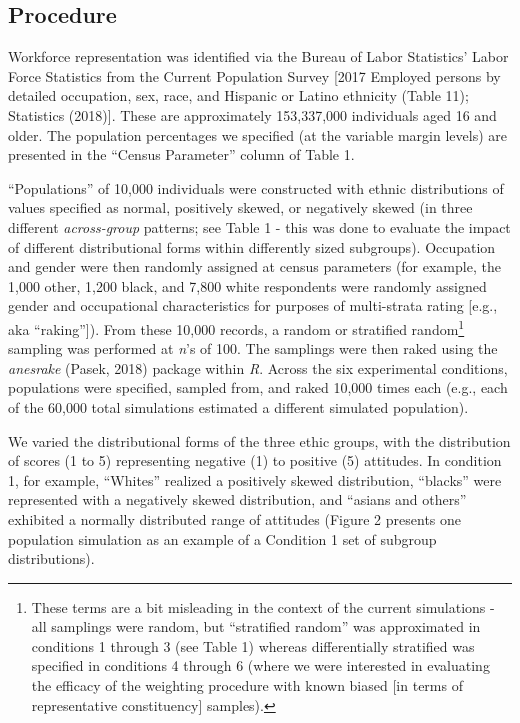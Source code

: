 \documentclass[
  ,man]{apa6}
\begin{document}
\hypertarget{procedure}{%
\subsection{Procedure}\label{procedure}}

Workforce representation was identified via the Bureau of Labor Statistics' Labor Force Statistics from the Current Population Survey {[}2017 Employed persons by detailed occupation, sex, race, and Hispanic or Latino ethnicity (Table 11); Statistics (2018){]}. These are approximately 153,337,000 individuals aged 16 and older. The population percentages we specified (at the variable margin levels) are presented in the ``Census Parameter'' column of Table 1.

``Populations'' of 10,000 individuals were constructed with ethnic distributions of values specified as normal, positively skewed, or negatively skewed (in three different \emph{across-group} patterns; see Table 1 - this was done to evaluate the impact of different distributional forms within differently sized subgroups). Occupation and gender were then randomly assigned at census parameters (for example, the 1,000 other, 1,200 black, and 7,800 white respondents were randomly assigned gender and occupational characteristics for purposes of multi-strata rating {[}e.g., aka ``raking''{]}). From these 10,000 records, a random or stratified random\footnote{These terms are a bit misleading in the context of the current simulations - all samplings were random, but ``stratified random'' was approximated in conditions 1 through 3 (see Table 1) whereas differentially stratified was specified in conditions 4 through 6 (where we were interested in evaluating the efficacy of the weighting procedure with known biased {[}in terms of representative constituency{]} samples).} sampling was performed at \emph{n}'s of 100. The samplings were then raked using the \emph{anesrake} (Pasek, 2018) package within \emph{R}. Across the six experimental conditions, populations were specified, sampled from, and raked 10,000 times each (e.g., each of the 60,000 total simulations estimated a different simulated population).

We varied the distributional forms of the three ethic groups, with the distribution of scores (1 to 5) representing negative (1) to positive (5) attitudes. In condition 1, for example, ``Whites'' realized a positively skewed distribution, ``blacks'' were represented with a negatively skewed distribution, and ``asians and others'' exhibited a normally distributed range of attitudes (Figure 2 presents one population simulation as an example of a Condition 1 set of subgroup distributions).
\end{document}
